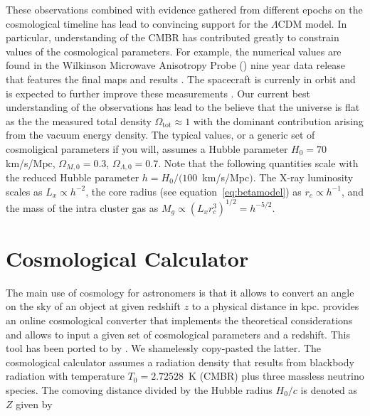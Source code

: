 \documentclass[MScProj_TLRH_ClusterEnergy.tex]{subfiles}
\begin{document}
These observations combined with evidence gathered from different epochs on the
cosmological timeline has lead to convincing support for the $\Lambda$CDM model.
In particular, understanding of the CMBR has contributed greatly to constrain 
values of the cosmological parameters. For example, the numerical values are found in 
the Wilkinson Microwave Anisotropy Probe () nine year data release
that features the final maps and results \citep{2013ApJS..208...20B}. The 
 spacecraft is currenly in orbit and is expected to further
improve these measurements \citep{2015arXiv150201582P}. Our current best understanding 
of the observations has lead to the believe that the universe is flat as the the 
measured total density $\Omega_{\text{tot}} \approx 1$ with the dominant 
contribution arising from the vacuum energy density. The typical values, or a generic
set of cosmoligical parameters if you will, assumes a Hubble parameter 
$H_0 = 70$ km/s/Mpc, $\Omega_{M,0} = 0.3$, $\Omega_{\Lambda,0} = 0.7$. Note that
the following quantities scale with the reduced Hubble parameter 
$h=H_0 / (100$~km/s/Mpc$)$. The X-ray luminosity scales as $L_x \propto h^{-2}$,
the core radius (see equation~\eqref{eq:betamodel}) as $r_c \propto h^{-1}$, and the
mass of the intra cluster gas as $M_g\propto (L_x r_c^3)^{1/2} = h^{-5/2}$.






\section*{Cosmological Calculator}

The main use of cosmology for astronomers is that it allows to convert an angle 
on the sky of an object at given redshift $z$ to a physical distance in kpc.
\citet{2006PASP..118.1711W} provides an online cosmological converter that
implements the theoretical considerations and allows to input a given set of
cosmological parameters and a redshift. This tool has been ported to  
by \citet{CosmologyCalculator}. We shamelessly copy-pasted the latter. The 
cosmological calculator assumes a radiation density that results from blackbody 
radiation with temperature $T_0 = 2.72528$~K (CMBR) plus three massless neutrino
species. The comoving distance divided by the Hubble radius $H_0/c$ is denoted 
as $Z$ given by
\end{document}
